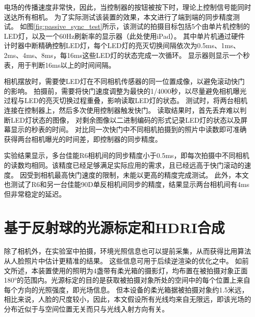 电场的传播速度非常快，因此，当控制器的按钮被按下时，理论上控制信号能同时送达所有相机。
为了实际测试该装置的效果，本文进行了端到端的同步精度测试。
如图\ref{fig:passive_sync_test}所示，该测试的拍摄目标包括5个由单片机控制的LED灯，以及一个60Hz刷新率的显示器（此处使用iPad）。
其中单片机通过硬件计时器中断精确控制LED灯，每个LED灯的亮灭切换间隔依次为0.5ms、1ms、2ms、4ms、8ms，每16ms这些LED灯的状态完成一次循环。
显示器则显示一个秒表，用于判断16ms以上的时间间隔。

相机摆放时，需要使LED灯在不同相机传感器的同一位置成像，以避免滚动快门的影响。
拍摄前，需要将快门速度调整为最快的1/4000秒，以尽量避免相机曝光过程与LED的亮灭切换过程重叠，影响读取LED灯的状态。
测试时，将两台相机连接在控制器上，然后多次使用控制器触发快门。
读取结果时，首先丢弃难以判断LED灯状态的图像，
对剩余图像以二进制编码的形式记录LED灯的状态以及屏幕显示的秒表的时间。
对比同一次快门中不同相机拍摄到的照片中读数即可准确获得两台相机曝光的时间差，即控制器的同步精度。

实验结果显示，多台佳能R6相机间的同步精度小于0.5ms，即每次拍摄中不同相机的读数均相同。该精度已经足够满足实际应用的需求，且已经远高于快门滚动的速度。
因受到相机最高快门速度的限制，未能以更高的精度完成测试。
此外，本文也测试了R6和另一台佳能90D单反相机间同步的精度，结果显示两台相机间有4ms但非常稳定的延迟。



\section{基于反射球的光源标定和HDRI合成}
\label{sec:light_calib}

除了相机外，在实验室中拍摄，环境光照信息也可以提前采集，从而获得比用算法从人脸照片中估计更精准的结果。
这些信息可用于后续逆渲染的优化之中。
如前文所述，本装置使用的照明为4盏带有柔光箱的摄影灯，均布置在被拍摄对象正面180°的范围内。光源标定的目的是获取被拍摄对象所处的空间中的每个位置上来自每个方向的光照强度，即光场信息。
但本设备的柔光箱据被拍摄对象约1.5米远，相比来说，人脸的尺度较小，因此，本文假设所有光线均来自无限远，即该光场的分布近似于与空间位置无关而只与光线入射方向有关。

